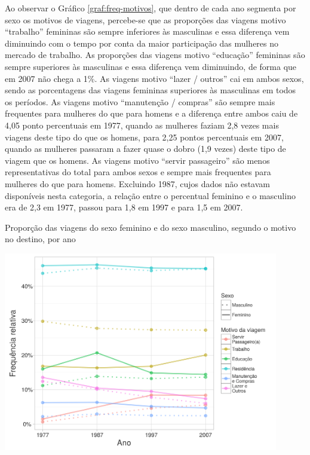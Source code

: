 Ao observar o Gráfico \ref{graf:freq-motivos}, que dentro de cada ano segmenta por sexo os motivos de viagens, percebe-se que as proporções das viagens motivo ``trabalho'' femininas são sempre inferiores às masculinas e essa diferença vem diminuindo com o tempo por conta da maior participação das mulheres no mercado de trabalho.
As proporções das viagens motivo ``educação'' femininas são sempre superiores às masculinas e essa diferença vem diminuindo, de forma que em 2007 não chega a 1\%.
As viagens motivo ``lazer / outros'' cai em ambos sexos, sendo as porcentagens das viagens femininas superiores às masculinas em todos os períodos.
As viagens motivo ``manutenção / compras'' são sempre mais frequentes para mulheres do que para homens e a diferença entre ambos caiu de 4,05 ponto percentuais em 1977, quando as mulheres faziam 2,8 vezes mais viagens deste tipo do que os homens, para 2,25 pontos percentuais em 2007, quando as mulheres passaram a fazer quase o dobro (1,9 vezes) deste tipo de viagem que os homens.
As viagens motivo ``servir passageiro'' são menos representativas do total para ambos sexos e sempre mais frequentes para mulheres do que para homens. Excluindo 1987, cujos dados não estavam disponíveis nesta categoria, a relação entre o percentual feminino e o masculino era de 2,3  em 1977, passou para 1,8 em 1997 e para 1,5 em 2007.

\begin{grafico}[htb]%
    \caption{\label{graf:freq-motivos}Proporção das viagens do sexo feminino e do sexo masculino, segundo o motivo no destino, por ano}%
    \begin{center}%
        \includegraphics[width=0.9\textwidth]{./imagens/freq-motivo.png}%
    \end{center}%
\end{grafico}%

